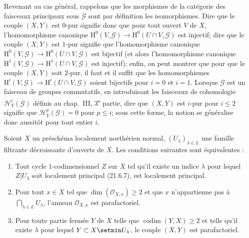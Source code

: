 \begin{remark}[21.13.13]
Revenant au cas général, rappelons que les morphismes de la catégorie des faisceaux
principaux sous $\mathscr G$ sont par définition les isomorphismes. Dire que le couple
$(X,Y)$ est $0$-pur signifie donc que pour tout ouvert $V$ de $X$, l'homomorphisme
canonique $\mathrm H^0(V,\mathscr G)\to\mathrm H^0(U\cap V,\mathscr G)$ est injectif;
dire que le couple $(X,Y)$ est $1$-pur signifie que l'homomorphisme canonique
$\mathrm H^0(V,\mathscr G)\to\mathrm H^0(U\cap V,\mathscr G)$ est bijectif (et alors
l'homomorphisme canonique
$\mathrm H^1(V,\mathscr G)\to\mathrm H^1(U\cap V,\mathscr G)$ est injectif); enfin,
on peut montrer que pour que le couple $(X,Y)$ soit $2$-pur, il faut et il suffit que
les homomorphismes
$\mathrm H^i(V,\mathscr G)\to\mathrm H^i(U\cap V,\mathscr G)$ soient bijectifs pour
$i=0$ et $i=1$. Lorsque $\mathscr G$ est un faisceau de groupes commutatifs, en
introduisant les faisceaux de cohomologie $\mathscr H_Y^i(\mathscr G)$ définis au
chap.~III, 3\textsuperscript{e} partie, dire que $(X,Y)$ est $i$-pur pour $i\leq2$
signifie que $\mathscr H_Y^p(\mathscr G)=0$ pour $p\leq i$; sous cette forme, la
notion se généralise donc aussitôt pour tout entier $i$.
\end{remark}

\begin{proposition}[21.13.14]
\label{IV.21.13.14}
Soient $X$ un préschéma localement noethérien normal,
$(U_\lambda)_{\lambda\in L}$ une famille filtrante décroissante d'ouverts de $X$. Les
conditions suivantes sont équivalentes :
\begin{enumerate}[label=\emph{\alph*)}]
  \item Tout cycle $1$-codimensionnel $Z$ sur $X$ tel qu'il existe un indice
  $\lambda$ pour lequel $Z|U_\lambda$ soit localement principal \textup{(21.6.7)}, est
  localement principal.
  \item Pour tout $x\in X$ tel que $\dim(\mathcal O_{X,x})\geq2$ et que $x$
  n'appartienne pas à $\bigcap_{\lambda\in L}U_\lambda$, l'anneau
  $\mathcal O_{X,x}$ est parafactoriel.
  \item[\textup{b$'$)}] Pour toute partie fermée $Y$ de $X$ telle que
$\operatorname{codim}(Y,X)\geq2$ et telle qu'il existe $\lambda$ pour lequel
$Y\subset X\setmin U_\lambda$, le couple $(X,Y)$ est parafactoriel.
\end{enumerate}
\end{proposition}

